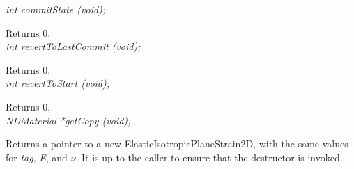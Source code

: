 {\em int commitState (void); } 

Returns $0$. \\

{\em int revertToLastCommit (void); } 

Returns $0$. \\

{\em int revertToStart (void); } 

Returns $0$. \\

{\em NDMaterial *getCopy (void); } 

Returns a pointer to a new ElasticIsotropicPlaneStrain2D, with the
same values for {\em tag}, {\em E}, and $\nu$. It is up to the
caller to ensure that the destructor is invoked. \\
